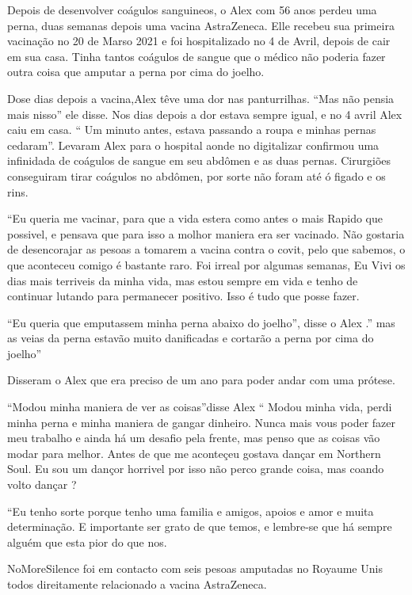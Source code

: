 Depois de desenvolver coágulos sanguineos, o Alex com 56 anos perdeu uma perna,
duas semanas depois uma vacina AstraZeneca. Elle recebeu sua primeira vacinação
no 20 de Marso 2021 e foi hospitalizado no 4 de Avril, depois de cair em sua
casa. Tinha tantos coágulos de sangue que o médico não poderia fazer outra coisa
que amputar a perna por cima do joelho.

Dose dias depois a vacina,Alex têve uma dor nas panturrilhas. ``Mas não pensia
mais nisso'' ele disse. Nos dias depois a dor estava sempre igual, e no 4 avril
Alex caiu em casa. `` Um minuto antes, estava passando a roupa e minhas pernas
cedaram''. Levaram Alex para o hospital aonde no digitalizar confirmou uma
infinidada de coágulos de sangue em seu abdômen e as duas pernas. Cirurgiões
conseguiram tirar coágulos no abdômen, por sorte não foram até ó figado e os
rins.

``Eu queria me vacinar, para que a vida estera como antes o mais Rapido que
possivel, e pensava que para isso a molhor maniera era ser vacinado. Não
gostaria de desencorajar as pesoas a tomarem a vacina contra o covit, pelo que
sabemos, o que aconteceu comigo é bastante raro. Foi irreal por algumas semanas,
Eu Vivi os dias mais terriveis da minha vida, mas estou sempre em vida e tenho
de continuar lutando para permanecer positivo. Isso é tudo que posse fazer.

``Eu queria que emputassem minha perna abaixo do joelho'', disse o Alex .'' mas
as veias da perna estavão muito danificadas e cortarão a perna por cima do
joelho''

Disseram o Alex que era preciso de um ano para poder andar com uma prótese.

``Modou minha maniera de ver as coisas''disse Alex `` Modou minha vida, perdi
minha perna e minha maniera de gangar dinheiro. Nunca mais vous poder fazer meu
trabalho e ainda há um desafio pela frente, mas penso que as coisas vão modar
para melhor. Antes de que me aconteçeu gostava dançar em Northern Soul. Eu sou
um dançor horrivel por isso não perco grande coisa, mas coando volto dançar ?

``Eu tenho sorte porque tenho uma familia e amigos, apoios e amor e muita
determinação. E importante ser grato de que temos, e lembre-se que há sempre
alguém que esta pior do que nos.

NoMoreSilence foi em contacto com seis pesoas amputadas no Royaume Unis todos
direitamente relacionado a vacina AstraZeneca.
